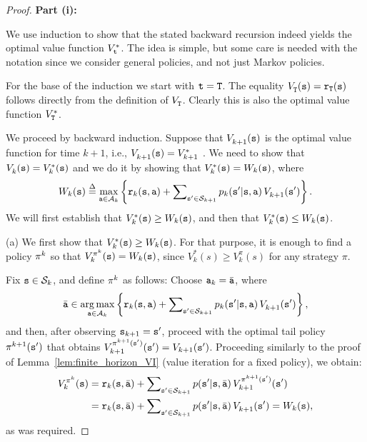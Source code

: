 \begin{proof}
\textbf{Part (i):}

We use induction to show that the stated backward recursion indeed
yields the optimal value function $V_{\tt t}^*$. The idea is simple,
but some care is needed with the notation since we consider general
policies, and not just Markov policies.

For the base of the induction we start with ${\tt t}={\tt T}$. The
equality $V_{\tt T}^{}({\tt s}) = {{\tt r}_{\tt T}}({\tt s})$
follows directly from the definition of $V_{\tt T}^{}$. Clearly
this is also the optimal value function $V^*_{{\tt T}}$.

We proceed by backward induction. Suppose that $V_{k +
1}^{}({\tt s})$ is the optimal value function for time $k + 1$, i.e.,
$V_{k + 1}^{}({\tt s})=V^*_{k+1}$ . We need to show that
$V_k^{}({\tt s}) = V^*_k({\tt s})$ and we do it by showing that
$V^*_k({\tt s})={W_k}({\tt s})$, where
 \[{W_k}(\state) \buildrel \Delta \over = {\max _{\action \in {\Actions_k}}}\left\{ {{\reward_k}(\state,\action) + \sum\nolimits_{\state' \in {\States_{k + 1}}} {{p_k}(\state'|\state,\action)\,} V_{k + 1}^{}(\state')} \right\}.\]
We will first establish that $V_k^{*}({\tt s}) \ge {W_k}({\tt s})$,
and then that $V_k^{*}({\tt s}) \le {W_k}({\tt s})$.

(a) We first show that $V_k^{*}({\tt s}) \ge {W_k}({\tt s})$. For that
purpose, it is enough to find a policy ${\pi ^k}$ so that
$V_k^{{\pi ^k}}({\tt s}) = {W_k}({\tt s})$, since $V^*_k(s)\geq
V^\pi_k(s)$ for any strategy $\pi$.

Fix ${\tt s} \in {\mathcal{S}_k}$, and define ${\pi ^k}$ as follows:
Choose ${{\tt a}_k} = \bar {{\tt a}}$, where
\[\bar{{\tt a}} \in \mathop {\arg \max }\limits_{{\tt a} \in {\mathcal{A}_k}} \left\{ {{{\tt r}_k}({\tt s},{\tt a}) + \sum\nolimits_{{\tt s}' \in {\mathcal{S}_{k + 1}}} {{p_k}({\tt s}'|{\tt s},{\tt a})} \,V_{k + 1}^{}({\tt s}')} \right\},\]
and then, after observing  ${{\tt s}_{k + 1}} = {\tt s}'$, proceed
with the optimal tail policy ${\pi ^{k + 1}}({\tt s}')$ that
obtains $V_{k + 1}^{{\pi ^{k + 1}}({\tt s}')}({\tt s}') = {V_{k +
1}}({\tt s}')$. Proceeding similarly to
the proof of Lemma~\ref{lem:finite_horizon_VI} (value iteration for
a fixed policy), we obtain:
\begin{align}
V_k^{{\pi ^k}}({\tt s}) &= {{\tt r}_k}({\tt s},\bar {{\tt a}}) + \sum\nolimits_{{\tt s}' \in {\mathcal{S}_{k + 1}}} {p({\tt s}'|{\tt s},\bar {{\tt a}})\,} V_{k + 1}^{{\pi ^{k + 1}}({\tt s}')}({\tt s}')\\
 &= {{\tt r}_k}({\tt s},\bar {{\tt a}}) + \sum\nolimits_{{\tt s}' \in {\mathcal{S}_{k + 1}}} {p({\tt s}'|{\tt s},\bar {{\tt a}})} \,V_{k + 1}^{}({\tt s}') = {W_k}({\tt s}),
\end{align}
as was required.


\end{proof}

